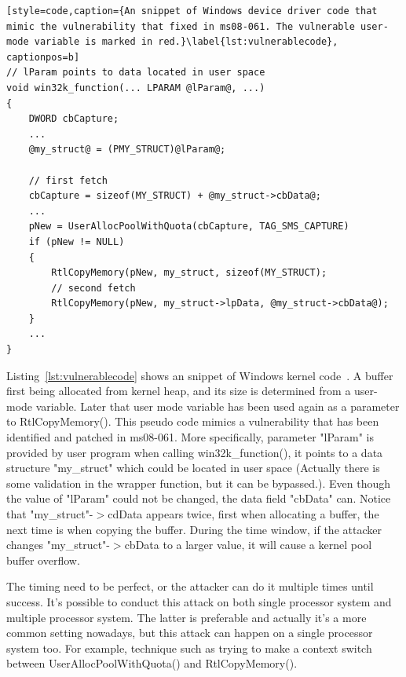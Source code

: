 \begin{lstlisting}[style=code,caption={An snippet of Windows device driver code that mimic the vulnerability that fixed in ms08-061. The vulnerable user-mode variable is marked in red.}\label{lst:vulnerablecode}, captionpos=b]
// lParam points to data located in user space
void win32k_function(... LPARAM @lParam@, ...) 
{
    DWORD cbCapture;
    ...
    @my_struct@ = (PMY_STRUCT)@lParam@;

    // first fetch
    cbCapture = sizeof(MY_STRUCT) + @my_struct->cbData@;  
    ...
    pNew = UserAllocPoolWithQuota(cbCapture, TAG_SMS_CAPTURE)
    if (pNew != NULL) 
    {
        RtlCopyMemory(pNew, my_struct, sizeof(MY_STRUCT);
        // second fetch
        RtlCopyMemory(pNew, my_struct->lpData, @my_struct->cbData@);   
    }
    ...
}

\end{lstlisting}

Listing~\ref{lst:vulnerablecode} shows an snippet of Windows kernel code~\cite{jurczyk2013identifying}. A buffer first being allocated from kernel heap, and its size is determined from a user-mode variable. Later that user mode variable has been used again as a parameter to RtlCopyMemory(). This pseudo code mimics a vulnerability that has been identified and patched in ms08-061. More specifically, parameter "lParam" is provided by user program when calling win32k\_function(), it points to a data structure "my\_struct" which could be located in user space (Actually there is some validation in the wrapper function, but it can be bypassed.). Even though the value of "lParam" could not be changed, the data field "cbData" can. Notice that "my\_struct"-$>$cdData appears twice, first when allocating a buffer, the next time is when copying the buffer. During the time window, if the attacker changes "my\_struct"-$>$cbData to a larger value, it will cause a kernel pool buffer overflow. 

The timing need to be perfect, or the attacker can do it multiple times until success. It's possible to conduct this attack on both single processor system and multiple processor system. The latter is preferable and actually it's a more common setting nowadays, but this attack can happen on a single processor system too. For example, technique such as trying to make a context switch between UserAllocPoolWithQuota() and RtlCopyMemory().

